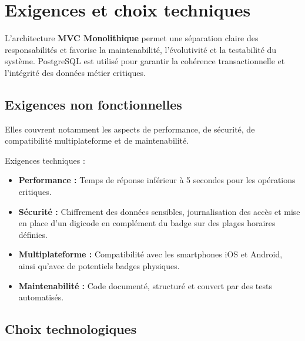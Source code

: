 \section{Exigences et choix techniques}
L’architecture \textbf{MVC Monolithique} permet une séparation claire des responsabilités et favorise la maintenabilité, l’évolutivité et la testabilité du système.  
PostgreSQL est utilisé pour garantir la cohérence transactionnelle et l’intégrité des données métier critiques.

\subsection{Exigences non fonctionnelles}
Elles couvrent notamment les aspects de performance, de sécurité, de compatibilité multiplateforme et de maintenabilité.
\newline

\begin{for_you}{Exigences techniques :}
    \begin{itemize}
        \item \textbf{Performance :} Temps de réponse inférieur à 5 secondes pour les opérations critiques.
        \item \textbf{Sécurité :} Chiffrement des données sensibles, journalisation des accès et mise en place d’un digicode en complément du badge sur des plages horaires définies.
        \item \textbf{Multiplateforme :} Compatibilité avec les smartphones iOS et Android, ainsi qu’avec de potentiels badges physiques.
        \item \textbf{Maintenabilité :} Code documenté, structuré et couvert par des tests automatisés.
    \end{itemize}
\end{for_you}

\subsection{Choix technologiques}

